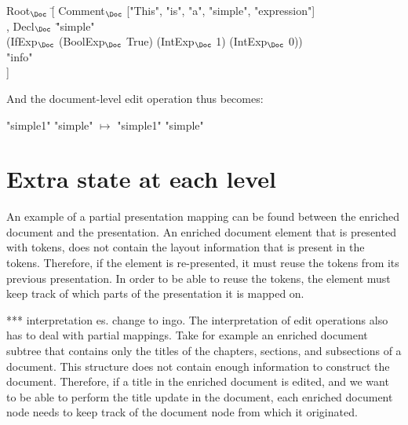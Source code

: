 \small \ttfamily
\begin{tabbing}
Root$_{\Doc}$ \= [ Comment$_{\Doc}$ ["This", "is", "a", "simple", "expression"] \\
       \> , Decl$_{\Doc}$ \= "simple" \\
       \>                        \>(IfExp$_{\Doc}$ (BoolExp$_{\Doc}$ True) (IntExp$_{\Doc}$ 1) (IntExp$_{\Doc}$ 0))\\
       \>                       \> "info"\\
       \> ] 
\end{tabbing}
\rmfamily \normalsize

And the document-level edit operation thus becomes:

\small \ttfamily
\begin{tabbing}
 \ttfamily "simple1"  \ttfamily  "simple" $\mapsto$  \ttfamily  "simple1"  \ttfamily  "simple"
\end{tabbing}
\rmfamily \normalsize






%																
%																
%																
\bc
\section{Extra state at each level} \label{sect:archExtraState}




An example of a partial presentation mapping can be found between the enriched document and the presentation. An enriched document element that is presented with tokens, does not contain the layout information that is present in the tokens. Therefore, if the element is re-presented, it must reuse the tokens from its previous presentation. In order to be able to reuse the tokens, the element must keep track of which parts of the presentation it is mapped on.

*** interpretation es. change to ingo.
The interpretation of edit operations also has to deal with partial mappings. Take for example an enriched document subtree that contains only the titles of the chapters, sections, and subsections of a document. This structure does not contain enough information to construct the document. Therefore, if a title in the enriched document is edited, and we want to be able to perform the title update in the document, each enriched document node needs to keep track of the document node from which it originated.

